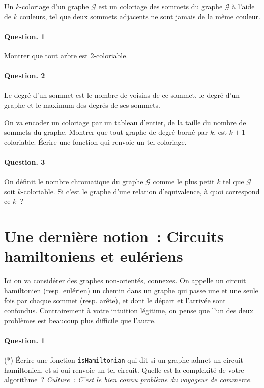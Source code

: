 \documentclass[10pt,a4paper]{article}
\begin{document}
Un $k$-coloriage d'un graphe $\mathcal{G}$ est un coloriage des sommets du 
graphe $\mathcal{G}$ à
l'aide de $k$ couleurs, tel que deux sommets adjacents ne sont jamais de la
même couleur.

\paragraph{Question. 1\\}
Montrer que tout arbre est 2-coloriable.

\paragraph{Question. 2\\}Le degré d'un sommet est le nombre de voisins
de ce sommet, le degré d'un graphe et le maximum des degrés de ses
sommets.

On va encoder un coloriage par un tableau d'entier, de la taille du
nombre de sommets du graphe. Montrer que tout graphe de degré borné par
$k$, est $k+1$-coloriable. Écrire une fonction qui renvoie un tel coloriage. 

\paragraph{Question. 3\\}
On définit le nombre chromatique du graphe $\mathcal{G}$ comme le plus petit $k$ tel que
$\mathcal{G}$ soit $k$-coloriable. Si c'est le graphe d'une relation d'equivalence, à quoi
correspond ce $k$~?

\section{Une dernière notion~: Circuits hamiltoniens et eulériens}
Ici on va considérer des graphes non-orientés, connexes.
On appelle un circuit hamiltonien (resp. eulérien) un chemin dans un graphe qui passe une
et une seule fois par chaque sommet (resp. arête), et dont le départ et l'arrivée
sont confondus. Contrairement à votre
intuition légitime, on pense
que l'un des deux problèmes est beaucoup plus difficile que l'autre. 

\paragraph{Question. 1\\}
(*) Écrire une fonction \texttt{isHamiltonian} qui
dit si un graphe admet un circuit hamiltonien, et si oui renvoie un tel circuit.
Quelle est la complexité de votre algorithme~? \emph{Culture~: C'est le
bien connu problème du voyageur de commerce.}
\end{document}
